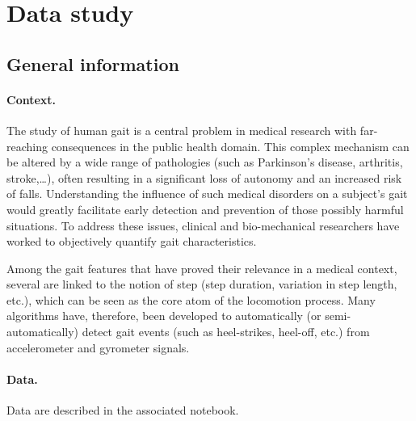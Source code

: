 \documentclass[11pt]{article}
\begin{document}
\section{Data study}

\subsection{General information}

\paragraph{Context.}
The study of human gait is a central problem in medical research with far-reaching consequences in the public health domain. This complex mechanism can be altered by a wide range of pathologies (such as Parkinson's disease, arthritis, stroke,\ldots), often resulting in a significant loss of autonomy and an increased risk of falls. Understanding the influence of such medical disorders on a subject's gait would greatly facilitate early detection and prevention of those possibly harmful situations. To address these issues, clinical and bio-mechanical researchers have worked to objectively quantify gait characteristics.

Among the gait features that have proved their relevance in a medical context, several are linked to the notion of step (step duration, variation in step length, etc.), which can be seen as the core atom of the locomotion process. Many algorithms have, therefore, been developed to automatically (or semi-automatically) detect gait events (such as heel-strikes, heel-off, etc.) from accelerometer and gyrometer signals.

\paragraph{Data.}
Data are described in the associated notebook.
\end{document}
